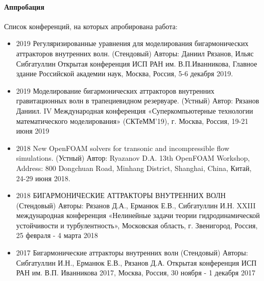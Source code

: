 %
%    
%    
%    
%    

\paragraph{Аппробация}

Список конференций, на которых апробирована работа:

\begin{itemize}

    \item 2019 Регуляризированные уравнения для моделирования бигармонических аттракторов внутренних волн. (Стендовый) Авторы: Даниил Рязанов, Ильяс Сибгатуллин Открытая конференция ИСП РАН им. В.П.Иванникова, Главное здание Российской академии наук, Москва, Россия, 5-6 декабря 2019.
    
    \item 2019 Моделирование бигармонических аттракторов внутренних гравитационных волн в трапециевидном резервуаре. (Устный) Автор: Рязанов Даниил. IV Международная конференция «Суперкомпьютерные технологии математического моделирования» (СКТеММ’19), г. Москва, Россия, 19-21 июня 2019
    
    \item 2018 New OpenFOAM solvers for transonic and incompressible flow simulations. (Устный) Автор: Ryazanov D.A. 13th OpenFOAM Workshop, Address: 800 Dongchuan Road, Minhang District, Shanghai, China, Китай, 24-29 июня 2018.
    
    \item 2018 БИГАРМОНИЧЕСКИЕ АТТРАКТОРЫ ВНУТРЕННИХ ВОЛН (Стендовый) Авторы: Рязанов Д.А., Ерманюк Е.В., Сибгатуллин И.Н. XXIII международная конференция «Нелинейные задачи теории гидродинамической устойчивости и турбулентность», Московская область, г. Звенигород, Россия, 25 февраля - 4 марта 2018
    
    \item 2017 Бигармонические аттракторы внутренних волн (Стендовый) Авторы: Сибгатуллин И.Н., Ерманюк Е.В., Рязанов Д.А. Открытая конференция ИСП РАН им. В.П. Иванникова 2017, Москва, Россия, 30 ноября - 1 декабря 2017
    
\end{itemize}

